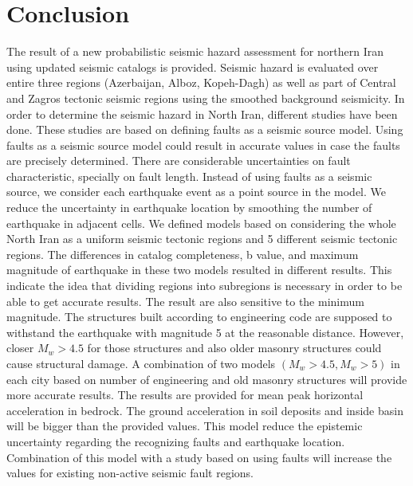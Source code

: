 \section{Conclusion}
The result of a new probabilistic seismic hazard assessment for northern Iran using updated seismic catalogs is provided. Seismic hazard is evaluated over entire three regions (Azerbaijan, Alboz, Kopeh-Dagh) as well as part of Central and Zagros tectonic seismic regions using the smoothed background seismicity. In order to determine the seismic hazard in North Iran, different studies have been done. These studies are based on defining faults as a seismic source model. Using faults as a seismic source model could result in accurate values in case the faults are precisely determined. There are considerable uncertainties on fault characteristic, specially on fault length. Instead of using faults as a seismic source, we consider each earthquake event as a point source in the model. We reduce the uncertainty in earthquake location by smoothing the number of earthquake in adjacent cells. We defined models based on considering the whole North Iran as a uniform seismic tectonic regions and 5 different seismic tectonic regions. The differences in catalog completeness, b value, and maximum magnitude of earthquake in these two models resulted in different results. This indicate the idea that dividing regions into subregions is necessary in order to be able to get accurate results. The result are also sensitive to the minimum magnitude. The structures built according to engineering code are supposed to withstand the earthquake with magnitude 5 at the reasonable distance. However, closer $M_w > 4.5$ for those structures and also older masonry structures could cause structural damage. A combination of two models $(M_w > 4.5, M_w>5)$ in each city based on number of engineering and old masonry structures will provide more accurate results. The results are provided for mean peak horizontal acceleration in bedrock. The ground acceleration in soil deposits and inside basin will be bigger than the provided values. This model reduce the epistemic uncertainty regarding the recognizing faults and earthquake location. Combination of this model with a study based on using faults will increase the values for existing non-active seismic fault regions.  
